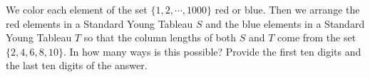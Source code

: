 We color each element of the set $\{1,2,\cdots ,1000\}$ red or blue. Then we arrange the red elements in a Standard Young Tableau $S$ and the
blue elements in a Standard Young Tableau $T$ so that the column lengths of both $S$ and $T$ come from the set $\{2,4,6,8,10\}$.
In how many ways is this possible? Provide the first ten digits and the last ten digits of the answer.
